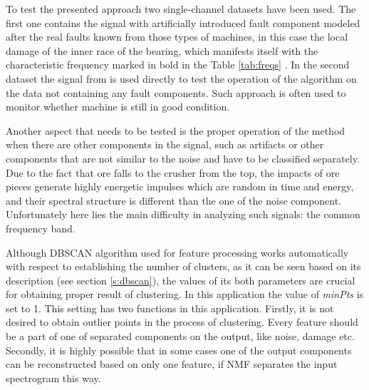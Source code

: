 \documentclass[3p,times]{elsarticle}
\begin{document}
\begin{table}[ht!]
  \centering
  \caption{Characteristic frequencies of 23264 CCK/W33 bearing}
  \label{tab:freqs}
\end{table}

To test the presented approach two single-channel datasets have been used. The first one contains the signal with artificially introduced fault component modeled after the real faults known from those types of machines, in this case the local damage of the inner race of the bearing, which manifests itself with the characteristic frequency marked in bold in the Table \ref{tab:freqs} \cite{obuchowski2015identification}. In the second dataset the signal from is used directly to test the operation of the algorithm on the data not containing any fault components. Such approach is often used to monitor whether machine is still in good condition.

Another aspect that needs to be tested is the proper operation of the method when there are other components in the signal, such as artifacts or other components that are not similar to the noise and have to be classified separately. Due to the fact that ore falls to the crusher from the top, the impacts of ore pieces generate highly energetic impulses which are random in time and energy, and their spectral structure is different than the one of the noise component. Unfortunately here lies the main difficulty in analyzing such signals: the common frequency band.

Although DBSCAN algorithm used for feature processing works automatically with respect to establishing the number of clusters, as it can be seen based on its description (see section \ref{s:dbscan}), the values of its both parameters are crucial for obtaining proper result of clustering. In this application the value of \emph{minPts} is set to 1. This setting has two functions in this application. Firstly, it is not desired to obtain outlier points in the process of clustering. Every feature should be a part of one of separated components on the output, like noise, damage etc. Secondly, it is highly possible that in some cases one of the output components can be reconstructed based on only one feature, if NMF separates the input spectrogram this way.
\end{document}
